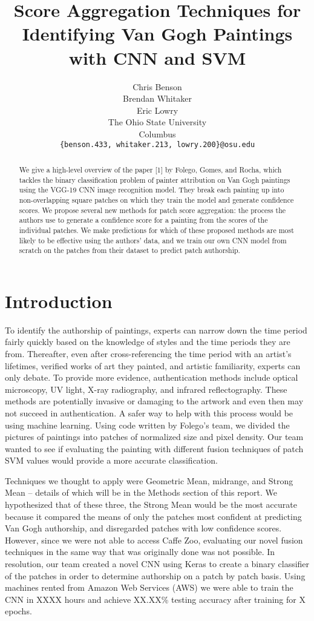 \documentclass{article}
\title{Score Aggregation Techniques for Identifying Van Gogh Paintings with CNN and SVM}
\author{  
  Chris Benson%
    \\
  \And
  Brendan Whitaker%
    \\
  \And
  Eric Lowry%
  \\
  The Ohio State University\\
  Columbus\\
  \texttt{\{benson.433, whitaker.213, lowry.200\}@osu.edu} \\  
}
\begin{document}

\maketitle

\begin{abstract}
We give a high-level overview of the paper [1] by Folego, Gomes, and Rocha, which tackles the binary classification problem of painter attribution on Van Gogh paintings using the VGG-19 CNN image recognition model. They break each painting up into non-overlapping square patches on which they train the model and generate confidence scores. We propose several new methods for patch score aggregation: the process the authors use to generate a confidence score for a painting from the scores of the individual patches. We make predictions for which of these proposed methods are most likely to be effective using the authors’ data, and we train our own CNN model from scratch on the patches from their dataset to predict patch authorship. 
\end{abstract}

\section{Introduction}

To identify the authorship of paintings, experts can narrow down the time period fairly quickly based on the knowledge of styles and the time periods they are from. Thereafter, even after cross-referencing the time period with an artist’s lifetimes, verified works of art they painted, and artistic familiarity, experts can only debate. To provide more evidence, authentication methods include optical microscopy, UV light, X-ray radiography, and infrared reflectography. These methods are potentially invasive or damaging to the artwork and even then may not succeed in authentication. A safer way to help with this process would be using machine learning. Using code written by Folego’s team, we divided the pictures of paintings into patches of normalized size and pixel density. Our team wanted to see if evaluating the painting with different fusion techniques of patch SVM values would provide a more accurate classification. 

Techniques we thought to apply were Geometric Mean, midrange, and Strong Mean -- details of which will be in the Methods section of this report. We hypothesized that of these three, the Strong Mean would be the most accurate because it compared the means of only the patches most confident at predicting Van Gogh authorship, and disregarded patches with low confidence scores. However, since we were not able to access Caffe Zoo, evaluating our novel fusion techniques in the same way that was originally done was not possible. In resolution, our team created a novel CNN using Keras to create a binary classifier of the patches in order to determine authorship on a patch by patch basis. Using machines rented from Amazon Web Services (AWS) we were able to train the CNN in XXXX hours and achieve XX.XX\% testing accuracy after training for X epochs. 
\end{document}
